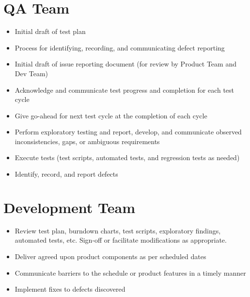 \documentclass[letterpaper,10pt,english,openany,oneside]{sphinxmanual}
\begin{document}
\section{QA Team}
\label{\detokenize{test_plan/roles_and_responsibilities:qa-team}}
\begin{itemize}
\item {} 
Initial draft of test plan

\item {} 
Process for identifying, recording, and communicating defect reporting

\item {} 
Initial draft of issue reporting document (for review by Product Team and Dev Team)

\item {} 
Acknowledge and communicate test progress and completion for each test cycle

\item {} 
Give go-ahead for next test cycle at the completion of each cycle

\item {} 
Perform exploratory testing and report, develop, and communicate observed inconsistencies, gaps, or ambiguous requirements

\item {} 
Execute tests (test scripts, automated tests, and regression tests as needed)

\item {} 
Identify, record, and report defects

\end{itemize}


\section{Development Team}
\label{\detokenize{test_plan/roles_and_responsibilities:development-team}}
\begin{itemize}
\item {} 
Review test plan, burndown charts, test scripts, exploratory findings, automated tests, etc.  Sign-off or facilitate modifications as appropriate.

\item {} 
Deliver agreed upon product components as per scheduled dates

\item {} 
Communicate barriers to the schedule or product features in a timely manner

\item {} 
Implement fixes to defects discovered

\end{itemize}
\end{document}

